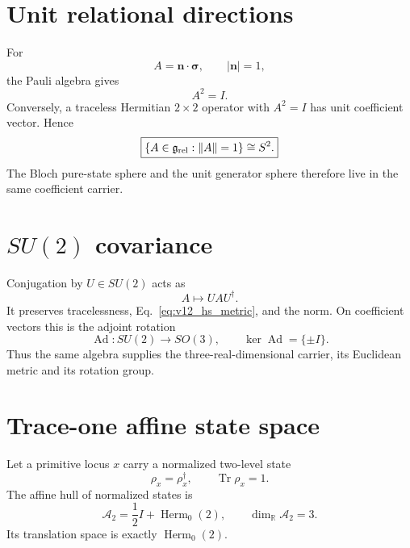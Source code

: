 \section{Unit relational directions}

For
\begin{equation}
A=\mathbf n\cdot\boldsymbol\sigma,
\qquad
|\mathbf n|=1,
\end{equation}
the Pauli algebra gives
\begin{equation}
A^2=I.
\end{equation}
Conversely, a traceless Hermitian $2\times2$ operator with $A^2=I$ has unit coefficient vector. Hence
\begin{equation}
\boxed{
\{A\in\mathfrak g_{\rm rel}:\|A\|=1\}
\cong S^2.
}
\label{eq:v12_generator_sphere}
\end{equation}
The Bloch pure-state sphere and the unit generator sphere therefore live in the same coefficient carrier.

\section[SU(2) covariance]{$SU(2)$ covariance}

Conjugation by $U\in SU(2)$ acts as
\begin{equation}
A\mapsto UAU^\dagger.
\end{equation}
It preserves tracelessness, Eq.~\eqref{eq:v12_hs_metric}, and the norm. On coefficient vectors this is the adjoint rotation
\begin{equation}
\boxed{
\operatorname{Ad}:SU(2)\to SO(3),
\qquad
\ker\operatorname{Ad}=\{\pm I\}.
}
\end{equation}
Thus the same algebra supplies the three-real-dimensional carrier, its Euclidean metric and its rotation group.

\section{Trace-one affine state space}

Let a primitive locus $x$ carry a normalized two-level state
\begin{equation}
\rho_x=\rho_x^\dagger,
\qquad
\operatorname{Tr}\rho_x=1.
\end{equation}
The affine hull of normalized states is
\begin{equation}
\boxed{
\mathcal A_2
=\frac12I+\operatorname{Herm}_0(2),
\qquad
\dim_{\mathbb R}\mathcal A_2=3.
}
\label{eq:v12_affine_state_space}
\end{equation}
Its translation space is exactly $\operatorname{Herm}_0(2)$.

